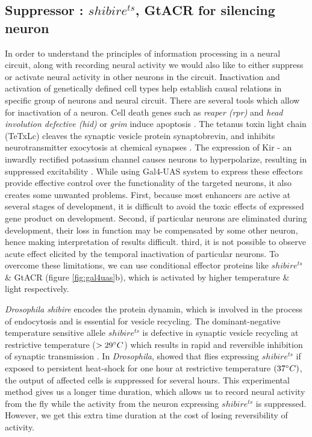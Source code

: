 \subsection{Suppressor : $shibire^{ts}$, GtACR for silencing neuron}
In order to understand the principles of information processing in a neural circuit, along with recording neural activity we would also like to either suppress or activate neural activity in other neurons in the circuit. Inactivation and activation of genetically defined cell types help establish causal relations in specific group of neurons and neural circuit. There are several tools which allow for inactivation of a neuron. Cell death genes such as \textit{reaper (rpr)} and \textit{head involution defective (hid)} or \textit{grim} induce apoptosis \parencite{Chen1996, Grether1995}.  The tetanus toxin light chain (TeTxLc) cleaves the synaptic vesicle protein synaptobrevin, and inhibits neurotransmitter exocytosis at chemical synapses \parencite{Sweeney1995}. The expression of Kir - an inwardly rectified potassium channel causes neurons to hyperpolarize, resulting in suppressed excitability \parencite{Johns1999}. While using Gal4-UAS system to express these effectors provide effective control over the functionality of the targeted neurons, it also creates some unwanted problems. First, because most enhancers are active at several stages of development, it is difficult to avoid the toxic effects of expressed gene product on development. Second, if particular neurons are eliminated during development, their loss in function may be compensated by some other neuron, hence making interpretation of results difficult. third, it is not possible to observe acute effect elicited by the temporal inactivation of particular neurons. To overcome these limitations, we can use conditional effector proteins like $shibire^{ts}$ \& GtACR (figure  \ref{fig:gal4uas}b), which is activated by higher temperature \& light respectively. 

\textit{Drosophila shibire} encodes the protein dynamin, which is involved in the process of endocytosis and is essential for vesicle recycling. The dominant-negative temperature sensitive allele $shibire^{ts}$ is defective in synaptic vesicle recycling at restrictive temperature ($>29\degree C$) which results in rapid and reversible inhibition of synaptic transmission \parencite{Kitamoto2001}. In \textit{Drosophila}, \cite{Joesch2010} showed that flies expressing $shibire^{ts}$ if exposed to persistent heat-shock for one hour at restrictive temperature $(37\degree C)$, the output of affected cells is suppressed for several hours. This experimental method gives us a longer time duration, which allows us to record neural activity from the fly while the activity from the neuron expressing $shibire^{ts}$ is suppressed. However, we get this extra time duration at the cost of losing reversibility of activity.

